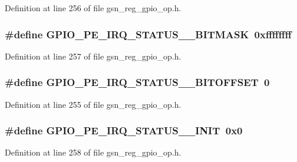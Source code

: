 Definition at line 256 of file gsn\_\-reg\_\-gpio\_\-op.h.

\hypertarget{a00553_ade3ee9807f4d54b11d505979fe3ca0fc}{
\subsubsection[{GPIO\_\-PE\_\-IRQ\_\-STATUS\_\-1\_\-BITMASK}]{\setlength{\rightskip}{0pt plus 5cm}\#define GPIO\_\-PE\_\-IRQ\_\-STATUS\_\_\-BITMASK~0xffffffff}}
\label{a00553_ade3ee9807f4d54b11d505979fe3ca0fc}


Definition at line 257 of file gsn\_\-reg\_\-gpio\_\-op.h.

\hypertarget{a00553_a293f291b2a382333575318983a19d42c}{
\subsubsection[{GPIO\_\-PE\_\-IRQ\_\-STATUS\_\-1\_\-BITOFFSET}]{\setlength{\rightskip}{0pt plus 5cm}\#define GPIO\_\-PE\_\-IRQ\_\-STATUS\_\_\-BITOFFSET~0}}
\label{a00553_a293f291b2a382333575318983a19d42c}


Definition at line 255 of file gsn\_\-reg\_\-gpio\_\-op.h.

\hypertarget{a00553_afb1716b5d0f39e27a9058d9fcb57f29d}{
\subsubsection[{GPIO\_\-PE\_\-IRQ\_\-STATUS\_\-1\_\-INIT}]{\setlength{\rightskip}{0pt plus 5cm}\#define GPIO\_\-PE\_\-IRQ\_\-STATUS\_\_\-INIT~0x0}}
\label{a00553_afb1716b5d0f39e27a9058d9fcb57f29d}


Definition at line 258 of file gsn\_\-reg\_\-gpio\_\-op.h.


